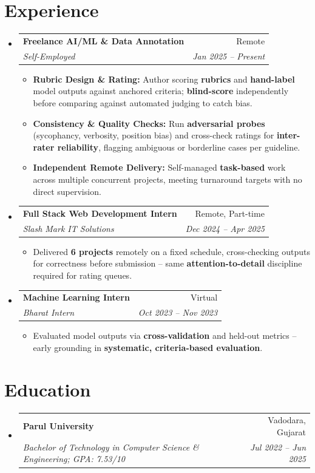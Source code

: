 \documentclass[letterpaper,10pt]{article}
\makeatletter
\newcommand{\resumeItem}[1]{\item\small{#1 \vspace{-3pt}}}
\newcommand{\resumeSubheading}[4]{
  \vspace{-1pt}\item
    \begin{tabular*}{0.97\textwidth}[t]{l@{\extracolsep{\fill}}r}
      \textbf{#1} & #2 \\
      \textit{\small#3} & \textit{\small #4} \\
    \end{tabular*}\vspace{-6pt}
}
\newcommand{\resumeSubHeadingListStart}{\begin{itemize}[leftmargin=0.15in, label={}]}
\newcommand{\resumeSubHeadingListEnd}{\end{itemize}\vspace{-2pt}}
\newcommand{\resumeItemListStart}{\begin{itemize}[itemsep=0pt]}
\newcommand{\resumeItemListEnd}{\end{itemize}\vspace{-4pt}}
\makeatother
\begin{document}
\section{Experience}
  \resumeSubHeadingListStart
    \resumeSubheading
      {Freelance AI/ML \& Data Annotation}{Remote}
      {Self-Employed}{Jan 2025 -- Present}
      \resumeItemListStart
        \resumeItem{\textbf{Rubric Design \& Rating:} Author scoring \textbf{rubrics} and
        \textbf{hand-label} model outputs against anchored criteria; \textbf{blind-score}
        independently before comparing against automated judging to catch bias.}
        \resumeItem{\textbf{Consistency \& Quality Checks:} Run \textbf{adversarial probes}
        (sycophancy, verbosity, position bias) and cross-check ratings for
        \textbf{inter-rater reliability}, flagging ambiguous or borderline cases per guideline.}
        \resumeItem{\textbf{Independent Remote Delivery:} Self-managed \textbf{task-based} work
        across multiple concurrent projects, meeting turnaround targets with no direct supervision.}
      \resumeItemListEnd

    \resumeSubheading
      {Full Stack Web Development Intern}{Remote, Part-time}
      {Slash Mark IT Solutions}{Dec 2024 -- Apr 2025}
      \resumeItemListStart
        \resumeItem{Delivered \textbf{6 projects} remotely on a fixed schedule, cross-checking
        outputs for correctness before submission -- same \textbf{attention-to-detail} discipline
        required for rating queues.}
      \resumeItemListEnd

    \resumeSubheading
      {Machine Learning Intern}{Virtual}
      {Bharat Intern}{Oct 2023 -- Nov 2023}
      \resumeItemListStart
        \resumeItem{Evaluated model outputs via \textbf{cross-validation} and held-out metrics --
        early grounding in \textbf{systematic, criteria-based evaluation}.}
      \resumeItemListEnd
  \resumeSubHeadingListEnd

\section{Education}
  \resumeSubHeadingListStart
    \resumeSubheading
      {Parul University}{Vadodara, Gujarat}
      {Bachelor of Technology in Computer Science \& Engineering; GPA: 7.53/10}{Jul 2022 -- Jun 2025}
  \resumeSubHeadingListEnd
\end{document}
